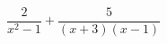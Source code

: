 \hspace*{2mm}\begin{minipage}[t]{\dimexpr\linewidth-2mm\relax}\vspace{0pt}
$\dfrac{2}{x^2-1}+\dfrac{5}{(x+3)(x-1)}$\end{minipage}
